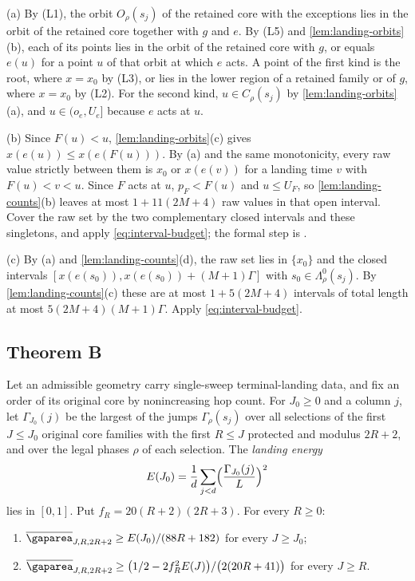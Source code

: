 \begin{outline}
(a) By (L1), the orbit $O_\rho(s_j)$ of the retained core with the exceptions lies in
the orbit of the retained core together with $g$ and $e$. By (L5) and
\cref{lem:landing-orbits}(b), each of its points lies in the orbit of the retained
core with $g$, or equals $e(u)$ for a point $u$ of that orbit at which $e$ acts. A
point of the first kind is the root, where $x=x_0$ by (L3), or lies in the lower
region of a retained family or of $g$, where $x=x_0$ by (L2). For the second kind,
$u\in C_\rho(s_j)$ by \cref{lem:landing-orbits}(a), and $u\in(o_e,U_e]$ because $e$
acts at $u$.

(b) Since $F(u)<u$, \cref{lem:landing-orbits}(c) gives $x(e(u))\le x(e(F(u)))$. By (a)
and the same monotonicity, every raw value strictly between them is $x_0$ or
$x(e(v))$ for a landing time $v$ with $F(u)<v<u$. Since $F$ acts at $u$, $p_F<F(u)$
and $u\le U_F$, so \cref{lem:landing-counts}(b) leaves at most $1+11(2M+4)$ raw values
in that open interval. Cover the raw set by the two complementary closed intervals and
these singletons, and apply \eqref{eq:interval-budget}; the formal step is
.

(c) By (a) and \cref{lem:landing-counts}(d), the raw set lies in $\{x_0\}$ and the
closed intervals $[x(e(s_0)),x(e(s_0))+(M+1)\Gamma]$ with $s_0\in\Lambda^0_\rho(s_j)$.
By \cref{lem:landing-counts}(c) these are at most $1+5(2M+4)$ intervals of total length
at most $5(2M+4)(M+1)\Gamma$. Apply \eqref{eq:interval-budget}.
\end{outline}

\subsection{Theorem B}

\begin{lemma}\label{lem:landing-prefix}
Let an admissible geometry carry single-sweep terminal-landing data, and fix an order
of its original core by nonincreasing hop count. For $J_0\ge0$ and a column $j$, let $\Gamma_{J_0}(j)$ be the largest of the
jumps $\Gamma_\rho(s_j)$ over all selections of the first $J\le J_0$ original core
families with the first $R\le J$ protected and modulus $2R+2$, and over the legal
phases $\rho$ of each selection. The \emph{landing energy}
\[
 E(J_0)=\frac1d\sum_{j<d}\Bigl(\frac{\Gamma_{J_0}(j)}L\Bigr)^2
\]
lies in $[0,1]$. Put $f_R=20(R+2)(2R+3)$. For every $R\ge0$:
\begin{enumerate}[label=(\alph*)]
\item $\meanarea_{J,R,2R+2}\ge E(J_0)/(88R+182)$ for every $J\ge J_0$;
\item $\meanarea_{J,R,2R+2}\ge\bigl(1/2-2f_R^2E(J)\bigr)/\bigl(2(20R+41)\bigr)$ for every
$J\ge R$.
\end{enumerate}
\end{lemma}

